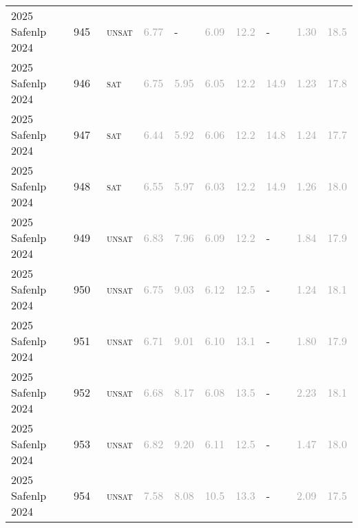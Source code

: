 \begin{center}
{\begin{longtable}{@{}llllllllll@{}}
2025 Safenlp 2024 & 945 & ~\textsc{unsat} & \textcolor{darkgray}{6.77} & - & \textcolor{darkgray}{6.09} & \textcolor{darkgray}{12.2} & - & \textcolor{darkgray}{1.30} & \textcolor{darkgray}{18.5} \\
2025 Safenlp 2024 & 946 & ~\textsc{sat} & \textcolor{darkgray}{6.75} & \textcolor{darkgray}{5.95} & \textcolor{darkgray}{6.05} & \textcolor{darkgray}{12.2} & \textcolor{darkgray}{14.9} & \textcolor{darkgray}{1.23} & \textcolor{darkgray}{17.8} \\
2025 Safenlp 2024 & 947 & ~\textsc{sat} & \textcolor{darkgray}{6.44} & \textcolor{darkgray}{5.92} & \textcolor{darkgray}{6.06} & \textcolor{darkgray}{12.2} & \textcolor{darkgray}{14.8} & \textcolor{darkgray}{1.24} & \textcolor{darkgray}{17.7} \\
2025 Safenlp 2024 & 948 & ~\textsc{sat} & \textcolor{darkgray}{6.55} & \textcolor{darkgray}{5.97} & \textcolor{darkgray}{6.03} & \textcolor{darkgray}{12.2} & \textcolor{darkgray}{14.9} & \textcolor{darkgray}{1.26} & \textcolor{darkgray}{18.0} \\
2025 Safenlp 2024 & 949 & ~\textsc{unsat} & \textcolor{darkgray}{6.83} & \textcolor{darkgray}{7.96} & \textcolor{darkgray}{6.09} & \textcolor{darkgray}{12.2} & - & \textcolor{darkgray}{1.84} & \textcolor{darkgray}{17.9} \\
2025 Safenlp 2024 & 950 & ~\textsc{unsat} & \textcolor{darkgray}{6.75} & \textcolor{darkgray}{9.03} & \textcolor{darkgray}{6.12} & \textcolor{darkgray}{12.5} & - & \textcolor{darkgray}{1.24} & \textcolor{darkgray}{18.1} \\
2025 Safenlp 2024 & 951 & ~\textsc{unsat} & \textcolor{darkgray}{6.71} & \textcolor{darkgray}{9.01} & \textcolor{darkgray}{6.10} & \textcolor{darkgray}{13.1} & - & \textcolor{darkgray}{1.80} & \textcolor{darkgray}{17.9} \\
2025 Safenlp 2024 & 952 & ~\textsc{unsat} & \textcolor{darkgray}{6.68} & \textcolor{darkgray}{8.17} & \textcolor{darkgray}{6.08} & \textcolor{darkgray}{13.5} & - & \textcolor{darkgray}{2.23} & \textcolor{darkgray}{18.1} \\
2025 Safenlp 2024 & 953 & ~\textsc{unsat} & \textcolor{darkgray}{6.82} & \textcolor{darkgray}{9.20} & \textcolor{darkgray}{6.11} & \textcolor{darkgray}{12.5} & - & \textcolor{darkgray}{1.47} & \textcolor{darkgray}{18.0} \\
2025 Safenlp 2024 & 954 & ~\textsc{unsat} & \textcolor{darkgray}{7.58} & \textcolor{darkgray}{8.08} & \textcolor{darkgray}{10.5} & \textcolor{darkgray}{13.3} & - & \textcolor{darkgray}{2.09} & \textcolor{darkgray}{17.5} \\

\end{longtable}}
\end{center}

